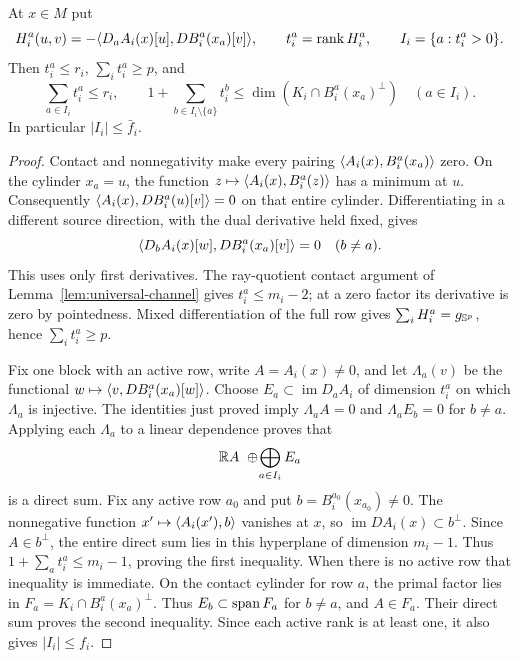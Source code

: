 \begin{theorem}\label{thm:face-sharing-local}
At $x\in M$ put
\[
 H_i^a(u,v)=-\langle D_aA_i(x)[u],DB_i^a(x_a)[v]\rangle,\qquad
 t_i^a=\operatorname{rank} H_i^a,\qquad I_i=\{a:t_i^a>0\}.
\]
Then $t_i^a\leq r_i$, $\sum_i t_i^a\geq p$, and
\begin{equation}\label{eq:face-packing}
 \sum_{a\in I_i}t_i^a\leq r_i,\qquad
 1+\sum_{b\in I_i\setminus\{a\}}t_i^b
 \leq\dim(K_i\cap B_i^a(x_a)^\perp)\quad(a\in I_i).
\end{equation}
In particular $|I_i|\leq\bar f_i$.
\end{theorem}
\begin{proof}
Contact and nonnegativity make every pairing
$\langle A_i(x),B_i^a(x_a)\rangle$ zero. On the cylinder $x_a=u$, the function
$z\mapsto\langle A_i(x),B_i^a(z)\rangle$ has a minimum at $u$. Consequently
$\langle A_i(x),DB_i^a(u)[v]\rangle=0$ on that entire cylinder. Differentiating
in a different source direction, with the dual derivative held fixed,
gives
\[
 \langle D_bA_i(x)[w],DB_i^a(x_a)[v]\rangle=0\quad(b\ne a).
\]
This uses only first derivatives. The ray-quotient contact argument of
Lemma~\ref{lem:universal-channel} gives $t_i^a\leq m_i-2$; at a zero factor
its derivative is zero by pointedness. Mixed differentiation of the
full row gives $\sum_iH_i^a=g_{\mathbb S^p}$, hence $\sum_i t_i^a\geq p$.

Fix one block with an active row, write $A=A_i(x)\ne0$, and let
$\Lambda_a(v)$ be the functional $w\mapsto\langle v,DB_i^a(x_a)[w]\rangle$.
Choose $E_a\subset\operatorname{im}D_aA_i$ of dimension $t_i^a$ on
which $\Lambda_a$ is injective. The identities just proved imply
$\Lambda_aA=0$ and $\Lambda_aE_b=0$ for $b\ne a$. Applying each
$\Lambda_a$ to a linear dependence proves that
\[
 \R A\ \oplus\!\bigoplus_{a\in I_i}E_a
\]
is a direct sum. Fix any active row $a_0$ and put
$b=B_i^{a_0}(x_{a_0})\ne0$. The nonnegative function
$x'\mapsto\langle A_i(x'),b\rangle$ vanishes at $x$, so
$\operatorname{im}DA_i(x)\subset b^\perp$. Since $A\in b^\perp$,
the entire direct sum lies in this hyperplane of dimension $m_i-1$.
Thus $1+\sum_a t_i^a\leq m_i-1$, proving the first inequality.
When there is no active row that inequality is immediate. On the contact
cylinder for row $a$, the primal factor lies in
$F_a=K_i\cap B_i^a(x_a)^\perp$. Thus $E_b\subset\operatorname{span} F_a$ for
$b\ne a$, and $A\in F_a$. Their direct sum proves the second
inequality. Since each active rank is at least one, it also gives
$|I_i|\leq f_i$.
\end{proof}

